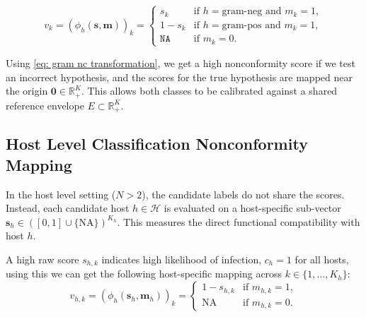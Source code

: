 

\begin{equation}
\label{eq: gram nc transformation}
v_k = (\phi_h(\mathbf{s}, \mathbf{m}))_k = \begin{cases} 
s_k & \text{if } h = \text{gram-neg} \text{ and } m_k = 1, \\
1 - s_k & \text{if } h = \text{gram-pos} \text{ and } m_k = 1, \\
\texttt{NA} & \text{if } m_k = 0.
\end{cases}
\end{equation}

Using \eqref{eq: gram nc transformation}, we get a high nonconformity score if we test an incorrect hypothesis, and 
the scores for the true hypothesis are mapped near the origin $\mathbf{0} \in \mathbb{R}_+^K$. This allows both classes 
to be calibrated against a shared reference envelope $E \subset \mathbb{R}_+^K$.



\subsection{Host Level Classification Nonconformity Mapping}
\label{sec3.3.2: host nc mapping}
In the host level setting ($N > 2$), the candidate labels do not share the scores. Instead, each candidate host $h 
\in \mathcal{H}$ is evaluated on a host-specific sub-vector $\mathbf{s}_h \in ([0,1] \cup \{\text{NA}\})^{K_h}$. This measures
the direct functional compatibility with host $h$. 

A high raw score $s_{h,k}$ indicates high likelihood of infection, $c_h = 1$ for all hosts, using this we can get the 
following host-specific mapping across $k \in \{1, \ldots, K_h\}$:
\begin{equation}
\label{eq: host nc transformation}
v_{h,k} = (\phi_h(\mathbf{s}_h, \mathbf{m}_h))_k = \begin{cases} 
1 - s_{h,k} & \text{if } m_{h,k} = 1, \\
\text{NA} & \text{if } m_{h,k} = 0.
\end{cases}
\end{equation}

